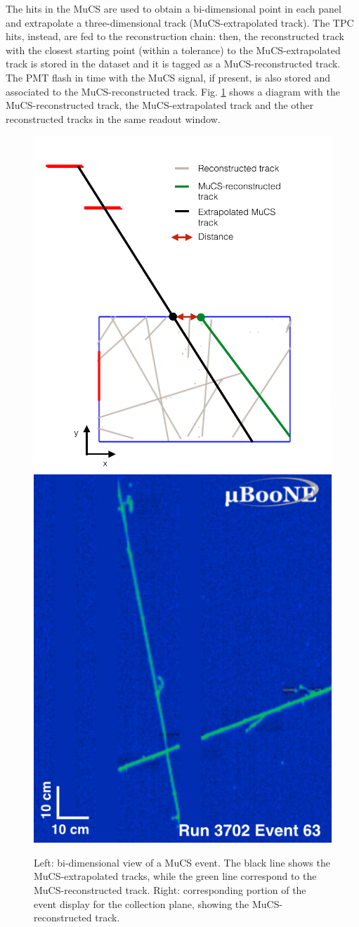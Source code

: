 \documentclass[a4paper]{scrartcl}
\begin{document}
The hits in the MuCS are used to obtain a bi-dimensional point in each panel and extrapolate a three-dimensional track (MuCS-extrapolated track). The TPC hits, instead, are fed to the reconstruction chain: then, the reconstructed track with the closest starting point (within a tolerance) to the MuCS-extrapolated track is stored in the dataset and it is tagged as a MuCS-reconstructed track. The PMT flash in time with the MuCS signal, if present, is also stored and associated to the MuCS-reconstructed track.  Fig. \ref{fig:evd} shows a diagram with the MuCS-reconstructed track, the MuCS-extrapolated track and the other reconstructed tracks in the same readout window.
\begin{figure}[htbp]
  \begin{center}
  \includegraphics[width=0.50\linewidth]{figures/evd.pdf}  \vspace{1.8em}\includegraphics[width=0.40\linewidth]{figures/evd_display.png}

  \caption{Left: bi-dimensional view of a MuCS event. The black line shows the MuCS-extrapolated tracks, while the green line correspond to the MuCS-reconstructed track. Right: corresponding portion of the event display for the collection plane, showing the MuCS-reconstructed track. } \label{fig:evd}
\end{center}
\end{figure}
\end{document}
